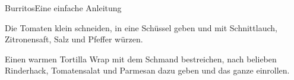 \begin{recipe}{Burritos}{Eine einfache Anleitung}
  \label{Burritos}
  \inglist

  \steps
  Die Tomaten klein schneiden, in eine Schüssel geben und mit Schnittlauch,
  Zitronensaft, Salz und Pfeffer würzen.

  Einen warmen Tortilla Wrap mit dem Schmand bestreichen, nach belieben
  Rinderhack, Tomatensalat und Parmesan dazu geben und das ganze einrollen.
\end{recipe}
